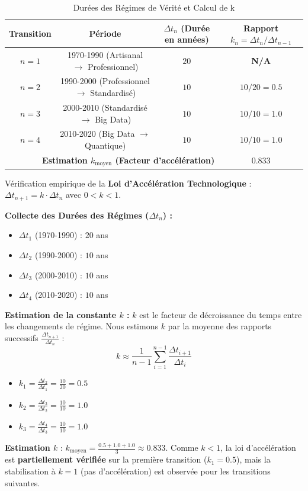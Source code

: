 \documentclass[memoire, 12pt]{report}
\begin{document}
\begin{table}[H]
\caption{Durées des Régimes de Vérité et Calcul de k}
\centering
\begin{tabular}{|c|c|c|c|}
\hline
\textbf{Transition} & \textbf{Période} & \textbf{$\Delta t_n$ (Durée en années)} & \textbf{Rapport $k_n = \Delta t_{n}/\Delta t_{n-1}$} \\
\hline
$n=1$ & 1970-1990 (Artisanal $\to$ Professionnel) & $20$ & \textbf{N/A} \\
\hline
$n=2$ & 1990-2000 (Professionnel $\to$ Standardisé) & $10$ & $10/20 = 0.5$ \\
\hline
$n=3$ & 2000-2010 (Standardisé $\to$ Big Data) & $10$ & $10/10 = 1.0$ \\
\hline
$n=4$ & 2010-2020 (Big Data $\to$ Quantique) & $10$ & $10/10 = 1.0$ \\
\hline
\multicolumn{3}{|r|}{\textbf{Estimation $k_{\text{moyen}}$ (Facteur d'accélération)}} & $\mathbf{0.833}$ \\
\hline
\end{tabular}
\end{table}

\vspace{1em}
Vérification empirique de la \textbf{Loi d'Accélération Technologique} : $\Delta t_{n+1}=k\cdot\Delta t_{n}$ avec $0<k<1$.

\textbf{Collecte des Durées des Régimes ($\Delta t_n$) :}
\begin{itemize}
    \item $\Delta t_1$ (1970-1990) : $20$ ans
    \item $\Delta t_2$ (1990-2000) : $10$ ans
    \item $\Delta t_3$ (2000-2010) : $10$ ans
    \item $\Delta t_4$ (2010-2020) : $10$ ans
\end{itemize}

\textbf{Estimation de la constante $k$ :} $k$ est le facteur de décroissance du temps entre les changements de régime. Nous estimons $k$ par la moyenne des rapports successifs $\frac{\Delta t_{n+1}}{\Delta t_n}$ :
$$
k \approx \frac{1}{n-1} \sum_{i=1}^{n-1} \frac{\Delta t_{i+1}}{\Delta t_i}
$$
\begin{itemize}
    \item $k_1 = \frac{\Delta t_2}{\Delta t_1} = \frac{10}{20} = 0.5$
    \item $k_2 = \frac{\Delta t_3}{\Delta t_2} = \frac{10}{10} = 1.0$
    \item $k_3 = \frac{\Delta t_4}{\Delta t_3} = \frac{10}{10} = 1.0$
\end{itemize}
\textbf{Estimation $k$} : $k_{\text{moyen}} = \frac{0.5 + 1.0 + 1.0}{3} \approx 0.833$.
Comme $k < 1$, la loi d'accélération est \textbf{partiellement vérifiée} sur la première transition ($k_1=0.5$), mais la stabilisation à $k=1$ (pas d'accélération) est observée pour les transitions suivantes.
\end{document}
